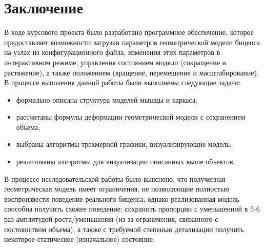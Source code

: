 \chapter*{Заключение}

В ходе курсового проекта было разработано программное обеспечение, которое предоставляет возможности загрузки параметров геометрической модели бицепса на узлах из конфигурационного файла, изменения этих параметров в интерактивном режиме, управления состоянием модели (сокращение и растяжение), а также положением (вращение, перемещение и масштабирование).
В процессе выполения данной работы были выполнены следующие задачи:
\begin{itemize}
    \item формально описана структура моделей мышцы и каркаса;
    \item рассчитаны формулы деформации геометрической модели с сохранением объема;
    \item выбраны алгоритмы трехмёрной графики, визуализирующие модель;
    \item реализованы алгоритмы для визуализации описанных выше объектов.
\end{itemize}

В процессе исследовательской работы было выяснено, что полученная геометрическая модель имеет ограничения, не позволяющие полностью воспроизвести поведение реального бицепса, однако реализованная модель способна получить схожее поведение: сохранить пропорции с уменьшенной в 5-6 раз амплитудой роста/уменьшения (из-за ограничения, связанного с постоянством объема), а также с требуемой степенью детализации получить некоторое статическое (изначальное) состояние.
